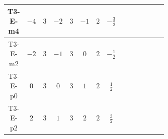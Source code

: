 \documentclass[8pt]{article}
\begin{document}
\begin{landscape}
\begin{longtable}{@{}cccccccc >{\raggedright\arraybackslash}p{0.21\linewidth} >{\raggedright\arraybackslash}p{0.21\linewidth} >{\raggedright\arraybackslash}p{0.21\linewidth}@{}}
\midrule
T3-E-m4 & $-4$ & $3$ & $-2$ & $3$ & $-1$ & $2$ & $-\frac{3}{2}$ & \scriptsize\adjustbox{max width=\linewidth}{$\begin{gathered} +D_{\mu _1}\left(S_{2,j_1}\right){}^{\dagger } D_{\mu _1}\left(S_{2,j_1}\right)\end{gathered}$} & \scriptsize\adjustbox{max width=\linewidth}{$\begin{gathered} -\frac{9 \hbar  B_{\mu _1\mu _2}^2}{2 \epsilon }\end{gathered}$} & \scriptsize\adjustbox{max width=\linewidth}{$\begin{gathered} -\frac{\hbar  \left(W_{\mu _1\mu _2}^{A_1}\right){}^2}{2 \epsilon }\end{gathered}$} \\
\midrule
T3-E-m2 & $-2$ & $3$ & $-1$ & $3$ & $0$ & $2$ & $-\frac{1}{2}$ & \scriptsize\adjustbox{max width=\linewidth}{$\begin{gathered} +D_{\mu _1}\left(S_{2,j_1}\right){}^{\dagger } D_{\mu _1}\left(S_{2,j_1}\right)\end{gathered}$} & \scriptsize\adjustbox{max width=\linewidth}{$\begin{gathered} -\frac{\hbar  B_{\mu _1\mu _2}^2}{2 \epsilon }\end{gathered}$} & \scriptsize\adjustbox{max width=\linewidth}{$\begin{gathered} -\frac{\hbar  \left(W_{\mu _1\mu _2}^{A_1}\right){}^2}{2 \epsilon }\end{gathered}$} \\
\midrule
T3-E-p0 & $0$ & $3$ & $0$ & $3$ & $1$ & $2$ & $\frac{1}{2}$ & \scriptsize\adjustbox{max width=\linewidth}{$\begin{gathered} +D_{\mu _1}\left(S_{2,j_1}\right){}^{\dagger } D_{\mu _1}\left(S_{2,j_1}\right)\end{gathered}$} & \scriptsize\adjustbox{max width=\linewidth}{$\begin{gathered} -\frac{\hbar  B_{\mu _1\mu _2}^2}{2 \epsilon }\end{gathered}$} & \scriptsize\adjustbox{max width=\linewidth}{$\begin{gathered} -\frac{\hbar  \left(W_{\mu _1\mu _2}^{A_1}\right){}^2}{2 \epsilon }\end{gathered}$} \\
\midrule
T3-E-p2 & $2$ & $3$ & $1$ & $3$ & $2$ & $2$ & $\frac{3}{2}$ & \scriptsize\adjustbox{max width=\linewidth}{$\begin{gathered} +D_{\mu _1}\left(S_{2,j_1}\right){}^{\dagger } D_{\mu _1}\left(S_{2,j_1}\right)\end{gathered}$} & \scriptsize\adjustbox{max width=\linewidth}{$\begin{gathered} -\frac{9 \hbar  B_{\mu _1\mu _2}^2}{2 \epsilon }\end{gathered}$} & \scriptsize\adjustbox{max width=\linewidth}{$\begin{gathered} -\frac{\hbar  \left(W_{\mu _1\mu _2}^{A_1}\right){}^2}{2 \epsilon }\end{gathered}$} \\

\end{longtable}
\end{landscape}
\end{document}
